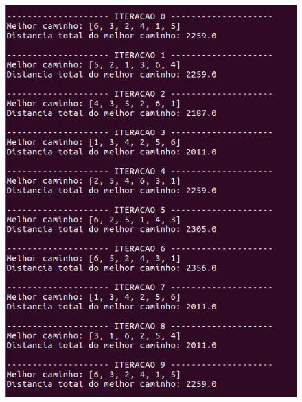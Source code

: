 \documentclass[hidelinks,12pt]{article}
\begin{document}
		\newpage
			
		\begin{figure}[!h]
			\centering
			\includegraphics[scale=0.6]{Figures/m6-2-1.png}
		\end{figure}

		\newpage
\end{document}
